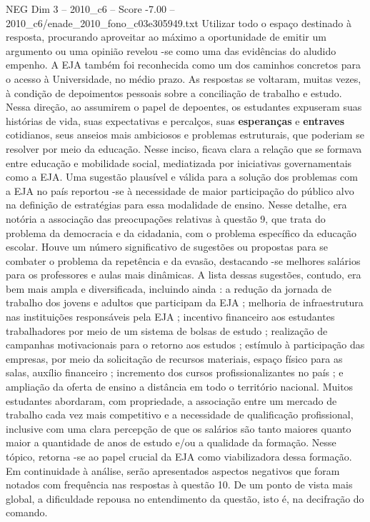 \begin{textsample}{NEG Dim 3 – 2010\_c6 – Score -7.00 – 2010\_c6/enade\_2010\_fono\_c03e305949.txt}
Utilizar todo o espaço destinado à resposta, procurando aproveitar ao máximo a oportunidade de emitir um argumento ou uma opinião revelou -se como uma das evidências do aludido empenho.
A EJA também foi reconhecida como um dos caminhos concretos para o acesso à Universidade, no médio prazo.
As respostas se voltaram, muitas vezes, à condição de depoimentos pessoais sobre a conciliação de trabalho e estudo.
Nessa direção, ao assumirem o papel de depoentes, os estudantes expuseram suas histórias de vida, suas expectativas e percalços, suas \textbf{esperanças} e \textbf{entraves} cotidianos, seus anseios mais ambiciosos e problemas estruturais, que poderiam se resolver por meio da educação.
Nesse inciso, ficava clara a relação que se formava entre educação e mobilidade social, mediatizada por iniciativas governamentais como a EJA.
Uma sugestão plausível e válida para a solução dos problemas com a EJA no país reportou -se à necessidade de maior participação do público alvo na definição de estratégias para essa modalidade de ensino.
Nesse detalhe, era notória a associação das preocupações relativas à questão 9, que trata do problema da democracia e da cidadania, com o problema específico da educação escolar.
Houve um número significativo de sugestões ou propostas para se combater o problema da repetência e da evasão, destacando -se melhores salários para os professores e aulas mais dinâmicas.
A lista dessas sugestões, contudo, era bem mais ampla e diversificada, incluindo ainda : a redução da jornada de trabalho dos jovens e adultos que participam da EJA ; melhoria de infraestrutura nas instituições responsáveis pela EJA ; incentivo financeiro aos estudantes trabalhadores por meio de um sistema de bolsas de estudo ; realização de campanhas motivacionais para o retorno aos estudos ; estímulo à participação das empresas, por meio da solicitação de recursos materiais, espaço físico para as salas, auxílio financeiro ; incremento dos cursos profissionalizantes no país ; e ampliação da oferta de ensino a distância em todo o território nacional.
Muitos estudantes abordaram, com propriedade, a associação entre um mercado de trabalho cada vez mais competitivo e a necessidade de qualificação profissional, inclusive com uma clara percepção de que os salários são tanto maiores quanto maior a quantidade de anos de estudo e/ou a qualidade da formação.
Nesse tópico, retorna -se ao papel crucial da EJA como viabilizadora dessa formação.
Em continuidade à análise, serão apresentados aspectos negativos que foram notados com frequência nas respostas à questão 10.
De um ponto de vista mais global, a dificuldade repousa no entendimento da questão, isto é, na decifração do comando.

\end{textsample}
